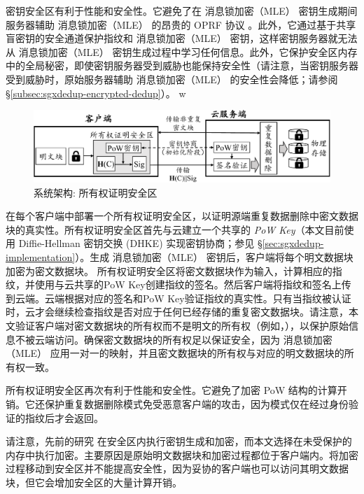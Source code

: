 密钥安全区有利于性能和安全性。它避免了在 消息锁加密（MLE） 密钥生成期间服务器辅助 消息锁加密（MLE） 的昂贵的 OPRF 协议 \cite{bellare2013DupLESS}。此外，它通过基于共享盲密钥的安全通道保护指纹和 消息锁加密（MLE） 密钥，这样密钥服务器就无法从 消息锁加密（MLE） 密钥生成过程中学习任何信息。此外，它保护安全区内存中的全局秘密，即使密钥服务器受到威胁也能保持安全性（请注意，当密钥服务器受到威胁时，原始服务器辅助 消息锁加密（MLE） 的安全性会降低；请参阅 \S\ref{subsec:sgxdedup-encrypted-dedup}）。
  w
\begin{figure}[!htb]
  \centering
  \includegraphics[width=\textwidth]{pic/sgxdedup/pow.pdf}
  \caption{\sysnameS 系统架构: 所有权证明安全区}
  \label{fig:sgxdedup-overview-pow}
  \vspace{-3pt}
\end{figure}

\sysnameS 在每个客户端中部署一个所有权证明安全区，以证明源端重复数据删除中密文数据块的真实性。所有权证明安全区首先与云建立一个共享的 \textit{PoW Key}（本文目前使用 Diffie-Hellman 密钥交换 (DHKE) 实现密钥协商；参见 \S\ref{sec:sgxdedup-implementation}）。生成 消息锁加密（MLE） 密钥后，客户端将每个明文数据块加密为密文数据块。 所有权证明安全区将密文数据块作为输入，计算相应的指纹，并使用与云共享的PoW Key创建指纹的签名。然后客户端将指纹和签名上传到云端。云端根据对应的签名和PoW Key验证指纹的真实性。只有当指纹被认证时，云才会继续检查指纹是否对应于任何已经存储的重复密文数据块。请注意，本文验证客户端对密文数据块的所有权而不是明文的所有权（例如，\cite{halevi11}），以保护原始信息不被云端访问。确保密文数据块的所有权足以保证安全，因为 消息锁加密（MLE） 应用一对一的映射，并且密文数据块的所有权与对应的明文数据块的所有权一致。

所有权证明安全区再次有利于性能和安全性。它避免了加密 PoW 结构的计算开销。它还保护重复数据删除模式免受恶意客户端的攻击，因为模式仅在经过身份验证的指纹后才会返回。

请注意，先前的研究 \cite{kim2019ShieldStore,fuhry20,djoko2019NEXUS} 在安全区内执行密钥生成和加密，而本文选择在未受保护的内存中执行加密。主要原因是原始明文数据块和加密过程都位于客户端内。将加密过程移动到安全区并不能提高安全性，因为妥协的客户端也可以访问其明文数据块，但它会增加安全区的大量计算开销。

